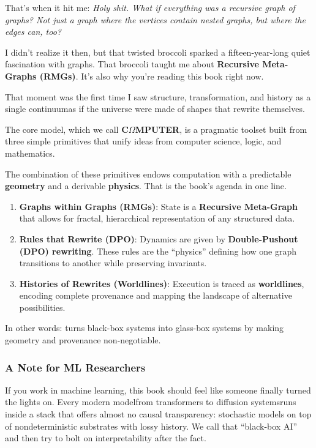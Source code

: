 That's when it hit me: \emph{Holy shit. What if everything was a recursive graph of graphs? Not just a graph where the vertices contain nested graphs, but where the edges can, too?}

I didn't realize it then, but that twisted broccoli sparked a fifteen-year-long quiet fascination with graphs. That broccoli taught me about \textbf{Recursive Meta-Graphs (RMGs)}. It's also why you're reading this book right now.

That moment was the first time I saw structure, transformation, and history as a single continuum\emd{}as if the universe were made of shapes that rewrite themselves.

The core model, which we call \textbf{C\texorpdfstring{\boldmath$\Omega$}{Omega}MPUTER}, is a pragmatic toolset built from three simple primitives that unify ideas from computer science, logic, and mathematics.



The combination of these primitives endows computation with a predictable \textbf{geometry} and a derivable \textbf{physics}. That is the book's agenda in one line.

\begin{enumerate}
    \item \textbf{Graphs within Graphs (RMGs)}: State is a \textbf{Recursive Meta-Graph} that allows for fractal, hierarchical representation of any structured data.
    \item \textbf{Rules that Rewrite (DPO)}: Dynamics are given by \textbf{Double-Pushout (DPO) rewriting}. These rules are the ``physics'' defining how one graph transitions to another while preserving invariants.
    \item \textbf{Histories of Rewrites (Worldlines)}: Execution is traced as \textbf{worldlines}, encoding complete provenance and mapping the landscape of alternative possibilities.
\end{enumerate}

\noindent
In other words: \COMPUTER{} turns black-box systems into glass-box systems by making geometry and provenance non-negotiable.

\subsubsection*{A Note for ML Researchers}
If you work in machine learning, this book should feel like someone finally turned the lights on. Every modern model\emd{}from transformers to diffusion systems\emd{}runs inside a stack that offers almost no causal transparency: stochastic models on top of nondeterministic substrates with lossy history. We call that ``black-box AI'' and then try to bolt on interpretability after the fact.

